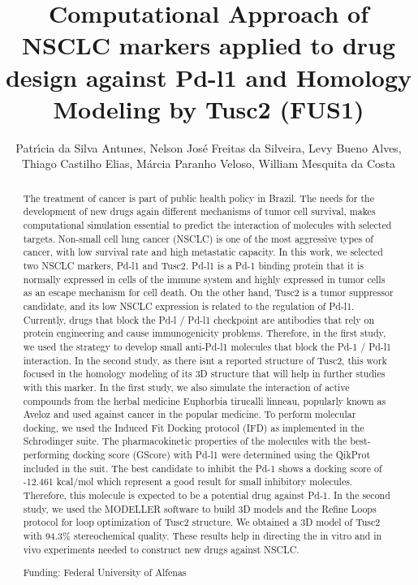 \documentclass[twoside]{article}
\title{\vspace{-15mm}\fontsize{24pt}{10pt}\selectfont\textbf{ Computational Approach of NSCLC markers applied to drug design against Pd-l1 and Homology Modeling by Tusc2 (FUS1) }} %
\author{ Patr\'{\i}cia da Silva Antunes, Nelson Jos\'e Freitas da Silveira, Levy Bueno Alves, Thiago Castilho Elias, M\'arcia Paranho Veloso, William Mesquita da Costa }
\affil{  }
\date{}
\begin{document}
  
  
  \maketitle %
  
  
  \thispagestyle{fancy} %
  
  
  \begin{abstract}
  The treatment of cancer is part of public health policy in Brazil. The needs for the development of new drugs again different mechanisms of tumor cell survival,  makes computational simulation essential to predict the interaction of molecules with selected targets. Non-small cell lung cancer (NSCLC) is one of the most aggressive types of cancer,  with low survival rate and high metastatic capacity. In this work,  we selected two NSCLC markers,  Pd-l1 and Tusc2. Pd-l1 is a Pd-1 binding protein that it is normally expressed in cells of the immune system and highly expressed in tumor cells as an escape mechanism for cell death. On the other hand,  Tusc2 is a tumor suppressor candidate,  and its low NSCLC expression is related to the regulation of Pd-l1. Currently,  drugs that block the Pd-l / Pd-l1 checkpoint are antibodies that rely on protein engineering and cause immunogenicity problems. Therefore,  in the first study,  we used the strategy to develop small anti-Pd-l1 molecules that block the Pd-1 / Pd-l1 interaction. In the second study,  as there isnt a reported structure of Tusc2,  this work focused in the homology modeling of its 3D structure that will help in further studies with this marker. In the first study,  we also simulate the interaction of active compounds from the herbal medicine Euphorbia tirucalli linneau,  popularly known as Aveloz and used against cancer in the popular medicine. To perform molecular docking,  we used the Induced Fit Docking protocol (IFD) as implemented in the Schrodinger suite. The pharmacokinetic properties of the molecules with the best-performing docking score (GScore) with Pd-l1 were determined using the QikProt included in the suit. The best candidate to inhibit the Pd-1 shows a docking score of -12.461 kcal/mol which represent a good result for small inhibitory molecules. Therefore,  this molecule is expected to be a potential drug against Pd-1. In the second study,  we used the MODELLER software to build 3D models and the Refine Loops protocol for loop optimization of Tusc2 structure. We obtained a 3D model of Tusc2 with 94.3\% stereochemical quality. These results help in directing the in vitro and in vivo experiments needed to construct new drugs against NSCLC.
  
  Funding: Federal University of Alfenas \\ 
  \end{abstract}
  
\end{document}
